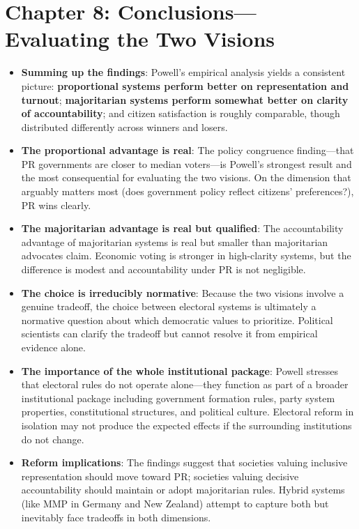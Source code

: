 \documentclass[12pt]{article}
\begin{document}
\section{Chapter 8: Conclusions---Evaluating the Two Visions}

\begin{itemize}[leftmargin=*, itemsep=4pt]
    \item \textbf{Summing up the findings}: Powell's empirical analysis yields a consistent picture: \textbf{proportional systems perform better on representation and turnout}; \textbf{majoritarian systems perform somewhat better on clarity of accountability}; and citizen satisfaction is roughly comparable, though distributed differently across winners and losers.
    \item \textbf{The proportional advantage is real}: The policy congruence finding---that PR governments are closer to median voters---is Powell's strongest result and the most consequential for evaluating the two visions. On the dimension that arguably matters most (does government policy reflect citizens' preferences?), PR wins clearly.
    \item \textbf{The majoritarian advantage is real but qualified}: The accountability advantage of majoritarian systems is real but smaller than majoritarian advocates claim. Economic voting is stronger in high-clarity systems, but the difference is modest and accountability under PR is not negligible.
    \item \textbf{The choice is irreducibly normative}: Because the two visions involve a genuine tradeoff, the choice between electoral systems is ultimately a normative question about which democratic values to prioritize. Political scientists can clarify the tradeoff but cannot resolve it from empirical evidence alone.
    \item \textbf{The importance of the whole institutional package}: Powell stresses that electoral rules do not operate alone---they function as part of a broader institutional package including government formation rules, party system properties, constitutional structures, and political culture. Electoral reform in isolation may not produce the expected effects if the surrounding institutions do not change.
    \item \textbf{Reform implications}: The findings suggest that societies valuing inclusive representation should move toward PR; societies valuing decisive accountability should maintain or adopt majoritarian rules. Hybrid systems (like MMP in Germany and New Zealand) attempt to capture both but inevitably face tradeoffs in both dimensions.

\end{itemize}
\end{document}
